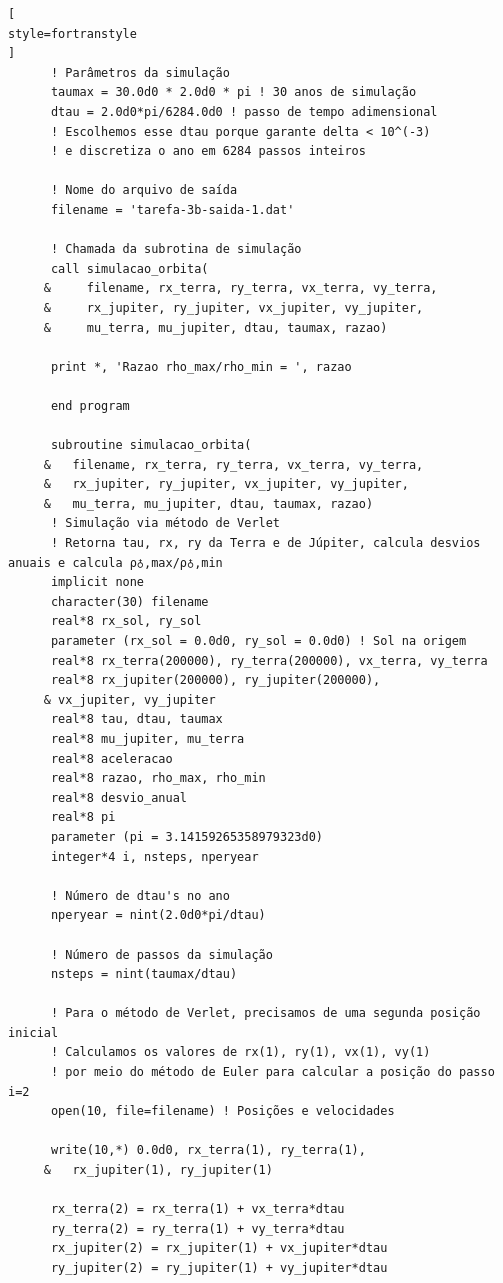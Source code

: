 \documentclass[12pt,a4paper]{article}
\begin{document}
\begin{lstlisting}[
style=fortranstyle
]
      ! Parâmetros da simulação
      taumax = 30.0d0 * 2.0d0 * pi ! 30 anos de simulação
      dtau = 2.0d0*pi/6284.0d0 ! passo de tempo adimensional
      ! Escolhemos esse dtau porque garante delta < 10^(-3)
      ! e discretiza o ano em 6284 passos inteiros

      ! Nome do arquivo de saída
      filename = 'tarefa-3b-saida-1.dat'

      ! Chamada da subrotina de simulação
      call simulacao_orbita(
     &     filename, rx_terra, ry_terra, vx_terra, vy_terra,
     &     rx_jupiter, ry_jupiter, vx_jupiter, vy_jupiter,
     &     mu_terra, mu_jupiter, dtau, taumax, razao)

      print *, 'Razao rho_max/rho_min = ', razao

      end program

      subroutine simulacao_orbita(
     &   filename, rx_terra, ry_terra, vx_terra, vy_terra,
     &   rx_jupiter, ry_jupiter, vx_jupiter, vy_jupiter,
     &   mu_terra, mu_jupiter, dtau, taumax, razao)
      ! Simulação via método de Verlet
      ! Retorna tau, rx, ry da Terra e de Júpiter, calcula desvios anuais e calcula ρ♁,max/ρ♁,min
      implicit none
      character(30) filename
      real*8 rx_sol, ry_sol
      parameter (rx_sol = 0.0d0, ry_sol = 0.0d0) ! Sol na origem
      real*8 rx_terra(200000), ry_terra(200000), vx_terra, vy_terra
      real*8 rx_jupiter(200000), ry_jupiter(200000), 
     & vx_jupiter, vy_jupiter
      real*8 tau, dtau, taumax
      real*8 mu_jupiter, mu_terra
      real*8 aceleracao
      real*8 razao, rho_max, rho_min
      real*8 desvio_anual
      real*8 pi
      parameter (pi = 3.14159265358979323d0)
      integer*4 i, nsteps, nperyear
      
      ! Número de dtau's no ano
      nperyear = nint(2.0d0*pi/dtau)

      ! Número de passos da simulação
      nsteps = nint(taumax/dtau)

      ! Para o método de Verlet, precisamos de uma segunda posição inicial
      ! Calculamos os valores de rx(1), ry(1), vx(1), vy(1)
      ! por meio do método de Euler para calcular a posição do passo i=2
      open(10, file=filename) ! Posições e velocidades

      write(10,*) 0.0d0, rx_terra(1), ry_terra(1), 
     &   rx_jupiter(1), ry_jupiter(1)

      rx_terra(2) = rx_terra(1) + vx_terra*dtau
      ry_terra(2) = ry_terra(1) + vy_terra*dtau
      rx_jupiter(2) = rx_jupiter(1) + vx_jupiter*dtau
      ry_jupiter(2) = ry_jupiter(1) + vy_jupiter*dtau


\end{lstlisting}
\end{document}
